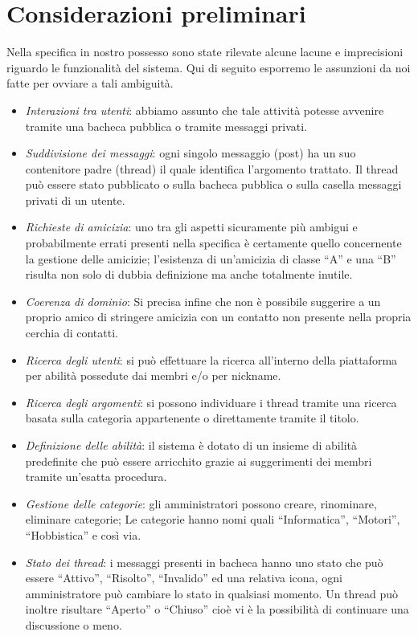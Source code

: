\documentclass[a4paper,12pt]{article}
\begin{document}
\section{Considerazioni preliminari}
Nella specifica in nostro possesso sono state rilevate alcune lacune e imprecisioni riguardo le funzionalità del sistema.
Qui di seguito esporremo le assunzioni da noi fatte per ovviare a tali ambiguità.
\begin{itemize}
\item \textit{Interazioni tra utenti}: abbiamo assunto che tale attività potesse avvenire tramite una bacheca pubblica o tramite messaggi privati.
\item \textit{Suddivisione dei messaggi}: ogni singolo messaggio (post) ha un suo contenitore padre (thread) il quale identifica l’argomento trattato. Il thread può essere stato pubblicato o sulla bacheca pubblica o sulla casella messaggi privati di un utente.
\item \textit{Richieste di amicizia}: uno tra gli aspetti sicuramente più ambigui e probabilmente errati presenti nella specifica è certamente quello concernente la gestione delle amicizie; l’esistenza di un’amicizia di classe “A” e una “B” risulta non solo di dubbia definizione ma anche totalmente inutile.
\item \textit{Coerenza di dominio}: Si precisa infine che non è possibile suggerire a un proprio amico di stringere amicizia con un contatto non presente nella propria cerchia di contatti.
\item \textit{Ricerca degli utenti}: si può effettuare la ricerca all’interno della piattaforma per abilità possedute dai membri e/o per nickname.
\item \textit{Ricerca degli argomenti}: si possono individuare i thread tramite una ricerca basata sulla categoria appartenente o direttamente tramite il titolo.
\item \textit{Definizione delle abilità}: il sistema è dotato di un insieme di abilità predefinite che può essere arricchito grazie ai suggerimenti dei membri tramite un’esatta procedura.
\item \textit{Gestione delle categorie}: gli amministratori possono creare, rinominare, eliminare categorie; Le categorie hanno nomi quali “Informatica”, “Motori”, “Hobbistica” e così via.
\item \textit{Stato dei thread}: i messaggi presenti in bacheca hanno uno stato che può essere “Attivo”, “Risolto”, “Invalido” ed una relativa icona, ogni amministratore può cambiare lo stato in qualsiasi momento. Un thread può inoltre risultare “Aperto” o “Chiuso” cioè vi è la possibilità di continuare una discussione o meno.
\end{itemize}
\end{document}
